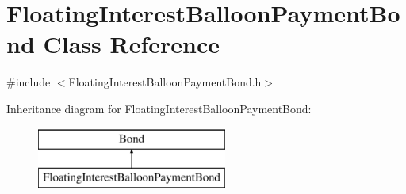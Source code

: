 \hypertarget{classFloatingInterestBalloonPaymentBond}{}\section{Floating\+Interest\+Balloon\+Payment\+Bond Class Reference}
\label{classFloatingInterestBalloonPaymentBond}


{\ttfamily \#include $<$Floating\+Interest\+Balloon\+Payment\+Bond.\+h$>$}

Inheritance diagram for Floating\+Interest\+Balloon\+Payment\+Bond\+:\begin{figure}[H]
\begin{center}
\leavevmode
\includegraphics[height=2.000000cm]{classFloatingInterestBalloonPaymentBond}
\end{center}
\end{figure}
